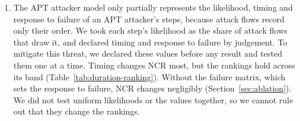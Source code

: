 \documentclass{cshonours}
\begin{document}
\begin{enumerate}[resume*=threats]
\item\label{thr:values}\label{thr:mapping} The APT attacker model only
partially represents the likelihood, timing and response to failure of an APT
attacker's steps, because attack flows record only their order. We took each
step's likelihood as the share of attack flows that draw it, and declared
timing and response to failure by judgement. To mitigate this threat, we
declared these values before any result and tested them one at a time. Timing
changes NCR most, but the rankings hold across its band
(Table~\ref{tab:duration-ranking}). Without the failure matrix, which sets
the response to failure, NCR changes negligibly (Section~\ref{sec:ablation}).
We did not test uniform likelihoods or the values together, so we cannot rule
out that they change the rankings.


\end{enumerate}
\end{document}
